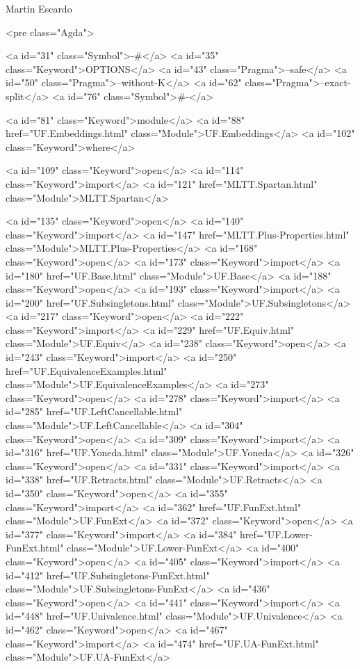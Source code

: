 Martin Escardo

<pre class="Agda">

<a id="31" class="Symbol">{-#</a> <a id="35" class="Keyword">OPTIONS</a> <a id="43" class="Pragma">--safe</a> <a id="50" class="Pragma">--without-K</a> <a id="62" class="Pragma">--exact-split</a> <a id="76" class="Symbol">#-}</a>

<a id="81" class="Keyword">module</a> <a id="88" href="UF.Embeddings.html" class="Module">UF.Embeddings</a> <a id="102" class="Keyword">where</a>

<a id="109" class="Keyword">open</a> <a id="114" class="Keyword">import</a> <a id="121" href="MLTT.Spartan.html" class="Module">MLTT.Spartan</a>

<a id="135" class="Keyword">open</a> <a id="140" class="Keyword">import</a> <a id="147" href="MLTT.Plus-Properties.html" class="Module">MLTT.Plus-Properties</a>
<a id="168" class="Keyword">open</a> <a id="173" class="Keyword">import</a> <a id="180" href="UF.Base.html" class="Module">UF.Base</a>
<a id="188" class="Keyword">open</a> <a id="193" class="Keyword">import</a> <a id="200" href="UF.Subsingletons.html" class="Module">UF.Subsingletons</a>
<a id="217" class="Keyword">open</a> <a id="222" class="Keyword">import</a> <a id="229" href="UF.Equiv.html" class="Module">UF.Equiv</a>
<a id="238" class="Keyword">open</a> <a id="243" class="Keyword">import</a> <a id="250" href="UF.EquivalenceExamples.html" class="Module">UF.EquivalenceExamples</a>
<a id="273" class="Keyword">open</a> <a id="278" class="Keyword">import</a> <a id="285" href="UF.LeftCancellable.html" class="Module">UF.LeftCancellable</a>
<a id="304" class="Keyword">open</a> <a id="309" class="Keyword">import</a> <a id="316" href="UF.Yoneda.html" class="Module">UF.Yoneda</a>
<a id="326" class="Keyword">open</a> <a id="331" class="Keyword">import</a> <a id="338" href="UF.Retracts.html" class="Module">UF.Retracts</a>
<a id="350" class="Keyword">open</a> <a id="355" class="Keyword">import</a> <a id="362" href="UF.FunExt.html" class="Module">UF.FunExt</a>
<a id="372" class="Keyword">open</a> <a id="377" class="Keyword">import</a> <a id="384" href="UF.Lower-FunExt.html" class="Module">UF.Lower-FunExt</a>
<a id="400" class="Keyword">open</a> <a id="405" class="Keyword">import</a> <a id="412" href="UF.Subsingletons-FunExt.html" class="Module">UF.Subsingletons-FunExt</a>
<a id="436" class="Keyword">open</a> <a id="441" class="Keyword">import</a> <a id="448" href="UF.Univalence.html" class="Module">UF.Univalence</a>
<a id="462" class="Keyword">open</a> <a id="467" class="Keyword">import</a> <a id="474" href="UF.UA-FunExt.html" class="Module">UF.UA-FunExt</a>

